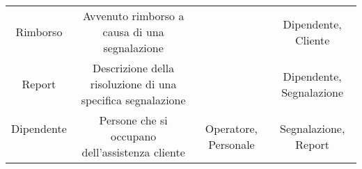 \begin{center}
\begin{tabular}{ |c|c|c|c|}
\multirow{3}{6em}{Rimborso} & \multirow{3}{12em}{Avvenuto rimborso a causa di una segnalazione} & \multirow{3}{8em}{} & \multirow{3}{12em}{Dipendente, Cliente} \\
&  &  & \\
&  &  & \\ 
\hline

\multirow{3}{6em}{Report} & \multirow{3}{12em}{Descrizione della risoluzione di una specifica segnalazione} & \multirow{3}{8em}{} & \multirow{3}{12em}{Dipendente, Segnalazione} \\
&  &  & \\
&  &  & \\ 
\hline

\multirow{0}{6em}{Dipendente} & \multirow{3}{12em}{Persone che si occupano dell'assistenza cliente} & \multirow{3}{8em}{Operatore, Personale} & \multirow{3}{12em}{Segnalazione, Report} \\
&  &  & \\
&  &  & \\ 
\hline

\end{tabular}
\end{center}